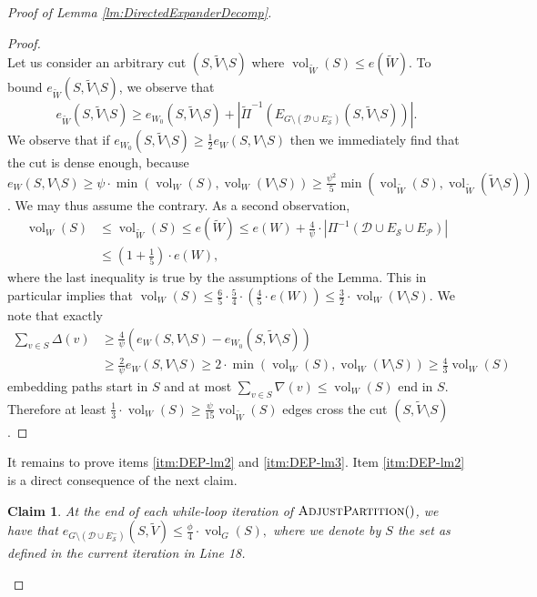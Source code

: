 \documentclass[11pt]{article}
\newtheorem{claim}[theorem]{Claim}
\DeclareMathOperator{\vol}{vol}
\begin{document}
\begin{proof}[Proof of Lemma \ref{lm:DirectedExpanderDecomp}]
\begin{proof}
\\
Let us consider an arbitrary cut $(S, \tilde{V} \setminus S)$ where $\vol_{\tilde{W}}(S) \leq e(\tilde{W})$. To bound $e_{\tilde{W}}(S, \tilde{V} \setminus S)$, we observe that 
\[e_{\tilde{W}}(S, \tilde{V} \setminus S) \geq e_{W_0}(S,\tilde{V} \setminus S) + \left|\tilde{\Pi}^{-1}\left(E_{G \setminus (\mathcal{D} \cup E_{\mathcal{S}}^-)}(S, \tilde{V} \setminus S)\right)\right|. \]
We observe that if $e_{W_0}(S,\tilde{V}\setminus S) \geq \frac{1}{2} e_{W}(S,V \setminus S)$ then we immediately find that the cut is dense enough, because $e_{W}(S,V\setminus S) \geq \psi \cdot \min \left(\vol_W(S), \vol_W(V \setminus S)\right) \geq \frac{\psi^2}{5} \min \left(\vol_{\tilde{W}}(S), \vol_{\tilde{W}}(\tilde{V} \setminus S)\right)$. We may thus assume the contrary. As a second observation, 
\begin{align*}
    \vol_W(S) &\leq \vol_{\tilde{W}}(S) \leq e(\tilde{W}) \leq e(W) + \frac{4}{\psi} \cdot |\Pi^{-1}(\mathcal{D} \cup E_{\mathcal{S}} \cup E_{\mathcal{P}})| \\
    &\leq \left(1 + \frac{1}{5}\right) \cdot e(W),
\end{align*}
where the last inequality is true by the assumptions of the Lemma. This in particular implies that $\vol_W(S) \leq \frac{6}{5} \cdot \frac{5}{4} \cdot \left(\frac{4}{5} \cdot e(W) \right) \leq \frac{3}{2} \cdot \vol_W(V \setminus S)$. We note that exactly 
\begin{align*}
    \sum_{v \in S} \Delta(v) &\geq \frac{4}{\psi} (e_W(S, V \setminus S) - e_{W_0}(S, \tilde{V} \setminus S)) \\
    &\geq \frac{2}{\psi} e_W(S, V \setminus S) \geq 2 \cdot \min\left(\vol_W(S), \vol_W(V \setminus S)\right) \geq \frac{4}{3} \vol_W(S)
\end{align*}
embedding paths start in $S$ and at most $\sum_{v \in S} \nabla(v) \leq \vol_W(S)$ end in $S$. Therefore at least $\frac{1}{3} \cdot \vol_W(S) \geq \frac{\psi}{15} \vol_{\tilde{W}}(S)$ edges cross the cut $(S,\tilde{V} \setminus S)$.



\end{proof}

It remains to prove items \ref{itm:DEP-lm2} and \ref{itm:DEP-lm3}. Item \ref{itm:DEP-lm2} is a direct consequence of the next claim.

\begin{claim}
    At the end of each while-loop iteration of $\textsc{AdjustPartition}()$, we have that $e_{G \setminus (\mathcal{D} \cup E_{\mathcal{S}}^-)}(S, \tilde{V}) \leq \frac{\phi}{4} \cdot \operatorname{vol}_{G}(S),$ where we denote by $S$ the set as defined in the current iteration in Line 18.
\end{claim}


\end{proof}
\end{document}
